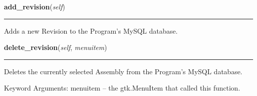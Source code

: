     \label{reliafree:revision:Revision:add_revision}

    \vspace{0.5ex}

\hspace{.8\funcindent}\begin{boxedminipage}{\funcwidth}

    \raggedright \textbf{add\_revision}(\textit{self})

    \vspace{-1.5ex}

    \rule{\textwidth}{0.5\fboxrule}
\setlength{\parskip}{2ex}
    Adds a new Revision to the Program's MySQL database.

\setlength{\parskip}{1ex}
    \end{boxedminipage}

    \label{reliafree:revision:Revision:delete_revision}

    \vspace{0.5ex}

\hspace{.8\funcindent}\begin{boxedminipage}{\funcwidth}

    \raggedright \textbf{delete\_revision}(\textit{self}, \textit{menuitem})

    \vspace{-1.5ex}

    \rule{\textwidth}{0.5\fboxrule}
\setlength{\parskip}{2ex}
    Deletes the currently selected Assembly from the Program's MySQL 
    database.

    Keyword Arguments: menuitem -- the gtk.MenuItem that called this 
    function.

\setlength{\parskip}{1ex}
    \end{boxedminipage}

    \label{reliafree:revision:Revision:load_general_data}

    \vspace{0.5ex}

